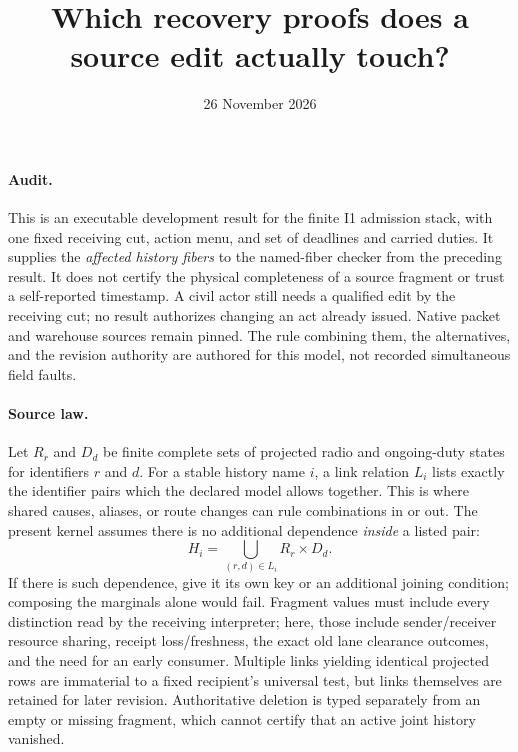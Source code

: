 \documentclass{article}
\title{Which recovery proofs does a source edit actually touch?}
\author{}
\date{26 November 2026}
\begin{document}
\maketitle

\paragraph{Audit.}
This is an executable development result for the finite I1 admission stack,
with one fixed receiving cut, action menu, and set of deadlines and carried
duties. It supplies the \emph{affected history fibers} to the named-fiber checker
from the preceding result. It does not certify the physical completeness of
a source fragment or trust a self-reported timestamp. A civil actor still
needs a qualified edit by the receiving cut; no result authorizes changing
an act already issued. Native packet and warehouse sources remain pinned.
The rule combining them, the alternatives, and the revision authority are
authored for this model, not recorded simultaneous field faults.

\paragraph{Source law.}
Let $R_r$ and $D_d$ be finite complete sets of projected radio and ongoing-duty
states for identifiers $r$ and $d$. For a stable history name $i$, a link
relation $L_i$ lists exactly the identifier pairs which the declared model
allows together. This is where shared causes, aliases, or route changes can
rule combinations in or out. The present kernel assumes there is no additional
dependence \emph{inside} a listed pair:
\[
H_i= \bigcup_{(r,d)\in L_i} R_r\times D_d .
\]
If there is such dependence, give it its own key or an additional joining
condition; composing the marginals alone would fail. Fragment values must
include every distinction read by the receiving interpreter; here, those
include sender/receiver resource sharing, receipt loss/freshness, the
exact old lane clearance outcomes, and the need for an early consumer.
Multiple links yielding identical projected rows are immaterial to a fixed
recipient's universal test, but links themselves are retained for later
revision. Authoritative deletion is typed separately from an empty or
missing fragment, which cannot certify that an active joint history vanished.
\end{document}
